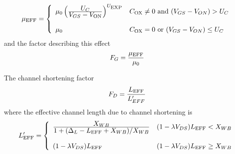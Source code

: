 {\begin{equation}
\mu_{\ms{EFF}} = \left\{ \begin{array}{ll}
               \UO\left( {{\textstyle\UCRIT}\over
                {\textstyle V_{GS}-V_{\ms{ON}}}} \right)^{\UEXP}
               & C_{\ms{OX}} \ne 0\mbox{ and } (V_{GS}-V_{ON}) > \UCRIT\\
                 \\
                 \UO
               & C_{\ms{OX}} = 0\mbox{ or } (V_{GS}-V_{ON}) \le \UCRIT
               \end{array} \right. %
\end{equation}
and the factor describing this effect
\begin{equation}
    F_G = {{\mu_{\mbox{\scriptsize EFF}}}\over{\mu_0}}
\end{equation}

The channel shortening factor
\begin{equation}
    F_D = {{L_{\mbox{\scriptsize EFF}}}\over{L'_{EFF}}}
\end{equation}
where the effective channel length due to channel shortening is
\begin{equation}
L'_{\ms{EFF}} = \left\{ \begin{array}{ll}
    {{\textstyle X_{WB}}\over
    {\textstyle 1 +(\Delta_L - L_{\ms{EFF}} + X_{WB})/X_{WB}}}
    & (1-\lambda V_{DS})L_{\ms{EFF}} < X_{WB} \\ \\
    (1-\lambda V_{DS})L_{\ms{EFF}}
    & (1-\lambda V_{DS})L_{\ms{EFF}} \ge X_{WB}
    \end{array} \right. %
\label{m2leff}
\end{equation}

}
